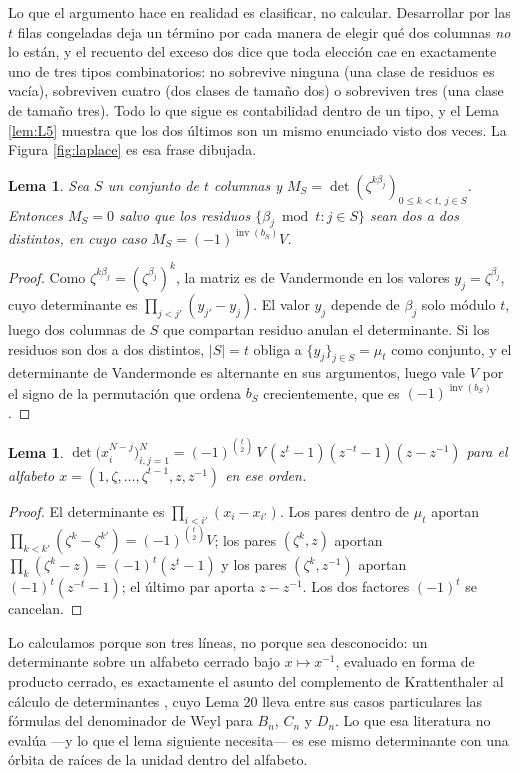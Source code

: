 \documentclass[11pt,reqno]{amsart}
\theoremstyle{plain}
\newtheorem{lemma}[theorem]{Lema}
\theoremstyle{definition}
\newcommand{\zt}{\mu_t}
\newcommand{\inv}{\operatorname{inv}}
\begin{document}
Lo que el argumento hace en realidad es clasificar, no calcular. Desarrollar por las $t$ filas
congeladas deja un término por cada manera de elegir qué dos columnas \emph{no} lo están, y el
recuento del exceso dos dice que toda elección cae en exactamente uno de tres tipos combinatorios:
no sobrevive ninguna (una clase de residuos es vacía), sobreviven cuatro (dos clases de tamaño dos) o
sobreviven tres (una clase de tamaño tres). Todo lo que sigue es contabilidad dentro de un tipo, y el
Lema \ref{lem:L5} muestra que los dos últimos son un mismo enunciado visto dos veces. La Figura \ref{fig:laplace} es esa frase dibujada.

\begin{lemma}\label{lem:L1}
Sea $S$ un conjunto de $t$ columnas y $M_S=\det(\zeta^{k\beta_j})_{0\le k<t,\,j\in S}$. Entonces
$M_S=0$ salvo que los residuos $\{\beta_j\bmod t:j\in S\}$ sean dos a dos distintos, en cuyo caso
$M_S=(-1)^{\inv(b_S)}V$.
\end{lemma}

\begin{proof}
Como $\zeta^{k\beta_j}=(\zeta^{\beta_j})^k$, la matriz es de Vandermonde en los valores
$y_j=\zeta^{\beta_j}$, cuyo determinante es $\prod_{j<j'}(y_{j'}-y_j)$. El valor $y_j$ depende de
$\beta_j$ solo módulo $t$, luego dos columnas de $S$ que compartan residuo anulan el determinante. Si
los residuos son dos a dos distintos, $|S|=t$ obliga a $\{y_j\}_{j\in S}=\zt$ como conjunto, y el
determinante de Vandermonde es alternante en sus argumentos, luego vale $V$ por el signo de la
permutación que ordena $b_S$ crecientemente, que es $(-1)^{\inv(b_S)}$.
\end{proof}

\begin{lemma}\label{lem:L2}
$\det\bigl(x_i^{N-j}\bigr)_{i,j=1}^{N}=(-1)^{\binom t2}\,V\,(z^t-1)(z^{-t}-1)(z-z^{-1})$ para el
alfabeto $x=(1,\zeta,\dots,\zeta^{t-1},z,z^{-1})$ en ese orden.
\end{lemma}

\begin{proof}
El determinante es $\prod_{i<i'}(x_i-x_{i'})$. Los pares dentro de $\zt$ aportan
$\prod_{k<k'}(\zeta^k-\zeta^{k'})=(-1)^{\binom t2}V$; los pares $(\zeta^k,z)$ aportan
$\prod_k(\zeta^k-z)=(-1)^t(z^t-1)$ y los pares $(\zeta^k,z^{-1})$ aportan $(-1)^t(z^{-t}-1)$; el
último par aporta $z-z^{-1}$. Los dos factores $(-1)^t$ se cancelan.
\end{proof}

\noindent Lo calculamos porque son tres líneas, no porque sea desconocido: un determinante sobre un
alfabeto cerrado bajo $x\mapsto x^{-1}$, evaluado en forma de producto cerrado, es exactamente el
asunto del complemento de Krattenthaler al cálculo de determinantes \cite[\S5.11]{KratADCC}, cuyo
Lema 20 lleva entre sus casos particulares las fórmulas del denominador de Weyl para $B_n$, $C_n$ y
$D_n$. Lo que esa literatura no evalúa ---y lo que el lema siguiente necesita--- es ese mismo
determinante con una órbita de raíces de la unidad dentro del alfabeto.
\end{document}

